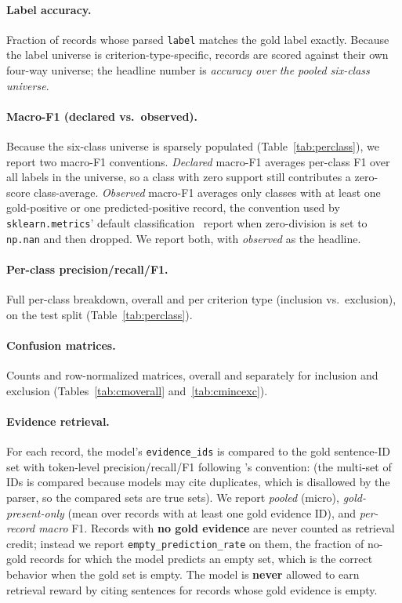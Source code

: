 \documentclass[conference]{IEEEtran}
\newcommand{\code}[1]{\texttt{\small #1}}
\begin{document}
\paragraph*{Label accuracy.}
Fraction of records whose parsed \code{label} matches the gold
label exactly. Because the label universe is
criterion-type-specific, records are scored against their own
four-way universe; the headline number is \emph{accuracy over
the pooled six-class universe}.

\paragraph*{Macro-F1 (declared vs.\ observed).}
Because the six-class universe is sparsely populated
(Table~\ref{tab:perclass}), we report two macro-F1 conventions.
\emph{Declared} macro-F1 averages per-class F1 over all labels in
the universe, so a class with zero support still contributes a
zero-score class-average. \emph{Observed} macro-F1 averages only
classes with at least one gold-positive or one predicted-positive
record, the convention used by \code{sklearn.metrics}' default
classification ~report when zero-division is set to
\code{np.nan} and then dropped. We report both, with
\emph{observed} as the headline.

\paragraph*{Per-class precision/recall/F1.}
Full per-class breakdown, overall and per criterion type
(inclusion vs.\ exclusion), on the test split
(Table~\ref{tab:perclass}).

\paragraph*{Confusion matrices.}
Counts and row-normalized matrices, overall and separately for
inclusion and exclusion
(Tables~\ref{tab:cmoverall} and~\ref{tab:cmincexc}).

\paragraph*{Evidence retrieval.}
For each record, the model's \code{evidence\_ids} is compared to the
gold sentence-ID set with token-level
precision/recall/F1 following
\cite{id2}'s convention:
(the multi-set of IDs is compared because models may cite
duplicates, which is disallowed by the parser, so the compared
sets are true sets).
We report \emph{pooled} (micro),
\emph{gold-present-only} (mean over records with at least one
gold evidence ID), and \emph{per-record macro} F1. Records
with \textbf{no gold evidence} are never counted as
retrieval credit; instead we report
\code{empty\_prediction\_rate} on them, the fraction of no-gold
records for which the model predicts an empty set, which is the
correct behavior when the gold set is empty. The model is
\textbf{never} allowed to earn retrieval reward by citing
sentences for records whose gold evidence is empty.
\end{document}
